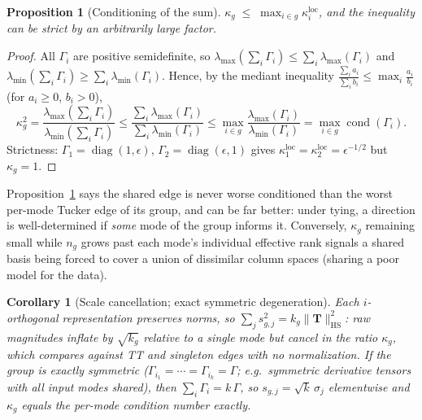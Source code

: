 \documentclass[11pt]{article}
\newtheorem{proposition}[theorem]{Proposition}
\newtheorem{corollary}[theorem]{Corollary}
\theoremstyle{definition}
\theoremstyle{remark}
\newcommand{\T}{\boldsymbol{T}}
\newcommand{\lammax}{\lambda_{\max}}
\newcommand{\lammin}{\lambda_{\min}}
\newcommand{\HS}{\mathrm{HS}}
\newcommand{\cond}{\operatorname{cond}}
\newcommand{\diag}{\operatorname{diag}}
\begin{document}
\begin{proposition}[Conditioning of the sum]\label{prop:mediant}
$\displaystyle \kappa_g \;\leq\; \max_{i \in g} \kappa^{\mathrm{loc}}_i$,
and the inequality can be strict by an arbitrarily large factor.
\end{proposition}

\begin{proof}
All $\Gamma_i$ are positive semidefinite, so
$\lammax(\sum_i \Gamma_i) \leq \sum_i \lammax(\Gamma_i)$ and
$\lammin(\sum_i \Gamma_i) \geq \sum_i \lammin(\Gamma_i)$. Hence, by the
mediant inequality
$\frac{\sum_i a_i}{\sum_i b_i} \leq \max_i \frac{a_i}{b_i}$
(for $a_i \ge 0$, $b_i > 0$),
\[
\kappa_g^2
= \frac{\lammax(\sum_i \Gamma_i)}{\lammin(\sum_i \Gamma_i)}
\leq \frac{\sum_i \lammax(\Gamma_i)}{\sum_i \lammin(\Gamma_i)}
\leq \max_{i \in g} \frac{\lammax(\Gamma_i)}{\lammin(\Gamma_i)}
= \max_{i \in g} \cond(\Gamma_i).
\]
Strictness: $\Gamma_1 = \diag(1, \epsilon)$, $\Gamma_2 = \diag(\epsilon, 1)$
gives $\kappa^{\mathrm{loc}}_1 = \kappa^{\mathrm{loc}}_2 = \epsilon^{-1/2}$
but $\kappa_g = 1$.
\end{proof}

Proposition~\ref{prop:mediant} says the shared edge is never worse
conditioned than the worst per-mode Tucker edge of its group, and can be far
better: under tying, a direction is well-determined if \emph{some} mode of
the group informs it. Conversely, $\kappa_g$ remaining small while $n_g$
grows past each mode's individual effective rank signals a shared basis being
forced to cover a union of dissimilar column spaces (sharing a poor model for
the data).

\begin{corollary}[Scale cancellation; exact symmetric degeneration]
\label{cor:sym}
Each $i$-orthogonal representation preserves norms, so
$\sum_j s_{g,j}^2 = k_g \|\T\|_{\HS}^2$: raw magnitudes inflate by
$\sqrt{k_g}$ relative to a single mode but cancel in the ratio $\kappa_g$,
which compares against TT and singleton edges with no normalization. If the
group is exactly symmetric ($\Gamma_{i_1} = \cdots = \Gamma_{i_k} =
\Gamma$; e.g.\ symmetric derivative tensors with all input modes shared),
then $\sum_i \Gamma_i = k\,\Gamma$, so $s_{g,j} = \sqrt{k}\,\sigma_j$
elementwise and $\kappa_g$ equals the per-mode condition number exactly.
\end{corollary}
\end{document}
